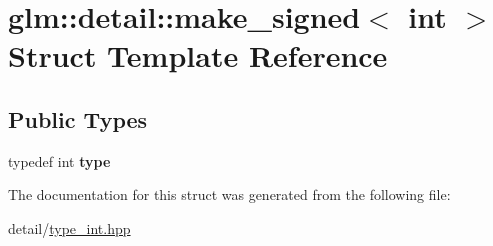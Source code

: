\hypertarget{structglm_1_1detail_1_1make__signed_3_01int_01_4}{\section{glm\-:\-:detail\-:\-:make\-\_\-signed$<$ int $>$ Struct Template Reference}
\label{structglm_1_1detail_1_1make__signed_3_01int_01_4}
}
\subsection*{Public Types}
\begin{DoxyCompactItemize}
\item 
\hypertarget{structglm_1_1detail_1_1make__signed_3_01int_01_4_a69085e97a5044d1985cdc2116eb6ea9b}{typedef int {\bfseries type}}\label{structglm_1_1detail_1_1make__signed_3_01int_01_4_a69085e97a5044d1985cdc2116eb6ea9b}

\end{DoxyCompactItemize}


The documentation for this struct was generated from the following file\-:\begin{DoxyCompactItemize}
\item 
detail/\hyperlink{type__int_8hpp}{type\-\_\-int.\-hpp}\end{DoxyCompactItemize}
